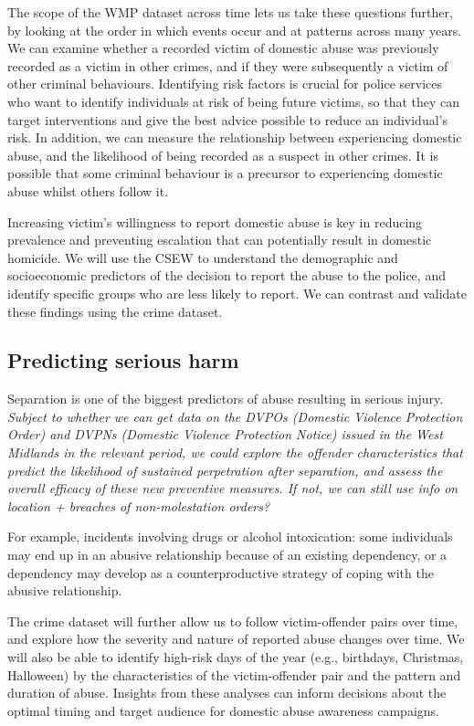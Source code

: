 \documentclass[11pt, a4paper]{article}
\begin{document}
The scope of the WMP dataset across time lets us take these questions further, by looking at the order in which events occur and at patterns across many years. We can examine whether a recorded victim of domestic abuse was previously recorded as a victim in other crimes, and if they were subsequently a victim of other criminal behaviours. Identifying risk factors is crucial for police services who want to identify individuals at risk of being future victims, so that they can target interventions and give the best advice possible to reduce an individual's risk. In addition, we can measure the relationship between experiencing domestic abuse, and the likelihood of being recorded as a suspect in other crimes. It is possible that some criminal behaviour is a precursor to experiencing domestic abuse whilst others follow it. 


Increasing victim's willingness to report domestic abuse is key in reducing prevalence and preventing escalation that can potentially result in domestic homicide. We will use the CSEW to understand the demographic and socioeconomic predictors of the decision to report the abuse to the police, and identify specific groups who are less likely to report. We can contrast and validate these findings using the crime dataset.



\subsection{Predicting serious harm}

Separation is one of the biggest predictors of abuse resulting in serious injury. \textit{Subject to whether we can get data on the DVPOs (Domestic Violence Protection Order) and DVPNs (Domestic Violence Protection Notice) issued in the West Midlands in the relevant period, we could explore the offender characteristics that predict the likelihood of sustained perpetration after separation, and assess the overall efficacy of these new preventive measures. If not, we can still use info on location + breaches of non-molestation orders?}

For example, incidents involving drugs or alcohol intoxication: some individuals may end up in an abusive relationship because of an existing dependency, or a dependency may develop as a counterproductive strategy of coping with the abusive relationship. 

The crime dataset will further allow us to follow victim-offender pairs over time, and explore how the severity and nature of reported abuse changes over time. We will also be able to identify high-risk days of the year (e.g., birthdays, Christmas, Halloween) by the characteristics of the victim-offender pair and the pattern and duration of abuse. Insights from these analyses can inform decisions about the optimal timing and target audience for domestic abuse awareness campaigns. 
\end{document}
